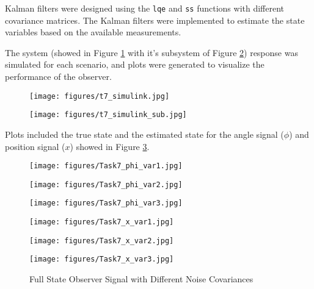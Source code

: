 \documentclass[12pt]{article}
\begin{document}
\noindent Kalman filters were designed using the \texttt{lqe} and \texttt{ss} functions with different covariance matrices. The Kalman filters were implemented to estimate the state variables based on the available measurements.
\medskip


\noindent  The system (showed in Figure \ref{fig:task7_simulink} with it's subsystem of Figure \ref{fig:task7_simulink_sub}) response was simulated for each scenario, and plots were generated to visualize the performance of the observer. 


\begin{figure}[ht!]
  \begin{center}
  \texttt{[image: figures/t7\_simulink.jpg]}
  \label{fig:task7_simulink}
  \end{center}
\end{figure}

\begin{figure}[ht!]
  \begin{center}
  \texttt{[image: figures/t7\_simulink\_sub.jpg]}
  \label{fig:task7_simulink_sub}
  \end{center}
\end{figure}


\noindent  Plots included the true state and the estimated state for the angle signal (\(\phi\)) and position signal (\(x\)) showed in Figure \ref{fig:task7}.
\newpage

\begin{figure}[htbp]
  \centering
  
  \begin{minipage}[b]{0.3\textwidth}
    \centering
    \texttt{[image: figures/Task7\_phi\_var1.jpg]}
  \end{minipage}%
  \hfill
  \begin{minipage}[b]{0.3\textwidth}
    \centering
    \texttt{[image: figures/Task7\_phi\_var2.jpg]}
  \end{minipage}%
  \hfill
  \begin{minipage}[b]{0.3\textwidth}
    \centering
    \texttt{[image: figures/Task7\_phi\_var3.jpg]}
  \end{minipage}%

  \medskip

  \begin{minipage}[b]{0.3\textwidth}
    \centering
    \texttt{[image: figures/Task7\_x\_var1.jpg]}
  \end{minipage}%
  \hfill
  \begin{minipage}[b]{0.3\textwidth}
    \centering
    \texttt{[image: figures/Task7\_x\_var2.jpg]}
  \end{minipage}%
  \hfill
  \begin{minipage}[b]{0.3\textwidth}
    \centering
    \texttt{[image: figures/Task7\_x\_var3.jpg]}
  \end{minipage}%
  \label{fig:task7}
  \caption{Full State Observer Signal with Different Noise Covariances}
\end{figure}
\end{document}

